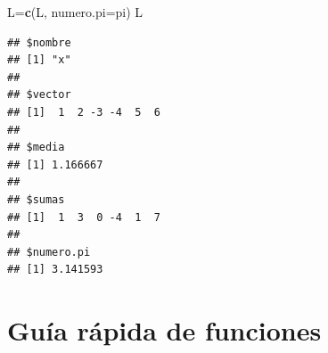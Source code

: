 \documentclass[]{book}
\newenvironment{Shaded}{\begin{snugshade}}{\end{snugshade}}
\newcommand{\DataTypeTok}[1]{\textcolor[rgb]{0.13,0.29,0.53}{#1}}
\newcommand{\KeywordTok}[1]{\textcolor[rgb]{0.13,0.29,0.53}{\textbf{#1}}}
\newcommand{\NormalTok}[1]{#1}
\theoremstyle{definition}
\theoremstyle{definition}
\theoremstyle{definition}
\theoremstyle{remark}
\begin{document}
\begin{Shaded}
\begin{Highlighting}[]
\NormalTok{L=}\KeywordTok{c}\NormalTok{(L, }\DataTypeTok{numero.pi=}\NormalTok{pi)}
\NormalTok{L}
\end{Highlighting}
\end{Shaded}

\begin{verbatim}
## $nombre
## [1] "x"
## 
## $vector
## [1]  1  2 -3 -4  5  6
## 
## $media
## [1] 1.166667
## 
## $sumas
## [1]  1  3  0 -4  1  7
## 
## $numero.pi
## [1] 3.141593
\end{verbatim}

\hypertarget{guia-rapida-de-funciones}{%
\section{Guía rápida de funciones}\label{guia-rapida-de-funciones}}
\end{document}
